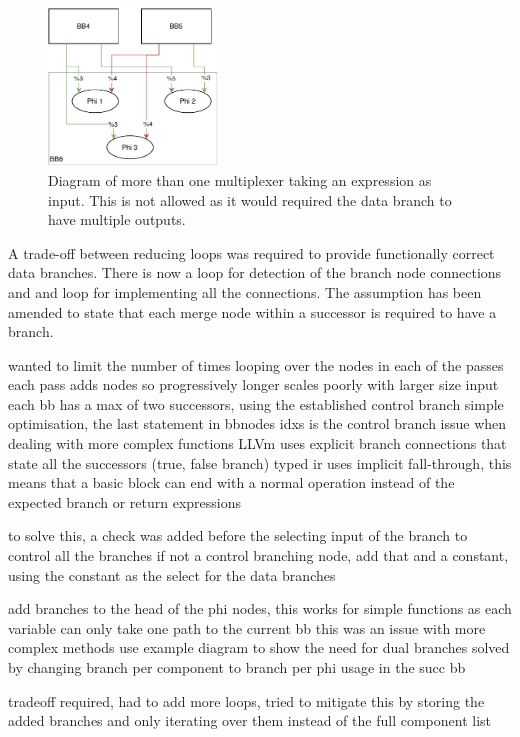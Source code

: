 \begin{figure}[htb!]
    \centering
    \includegraphics[width=0.4\textwidth]{Images/multi_mux.pdf}
    \caption{Diagram of more than one multiplexer taking an expression as input. This is not allowed as it would required the data branch to have multiple outputs.}
    \label{fig:multi_mux}
\end{figure}

A trade-off between reducing loops was required to provide functionally correct data branches. There is now a loop for detection of the branch node connections and and loop for implementing all the connections. The assumption has been amended to state that each merge node within a successor is required to have a branch.

\iffalse
	wanted to limit the number of times looping over the nodes in each of the passes
		each pass adds nodes so progressively longer
		scales poorly with larger size input	
	each bb has a max of two successors, using the established control branch 
	simple optimisation, the last statement in bbnodes idxs is the control branch
		issue when dealing with more complex functions
		LLVm uses explicit branch connections that state all the successors (true, false branch)
		typed ir uses implicit fall-through, this means that a basic block can end with a normal operation instead of the expected branch or return expressions
		
	to solve this, a check was added before the selecting input of the branch to control all the branches
		if not a control branching node, add that and a constant, using the constant as the select for the data branches

add branches to the head of the phi nodes, this works for simple functions as each variable can only take one path to the current bb
	this was an issue with more complex methods
	use example diagram to show the need for dual branches
	solved by changing branch per component to branch per phi usage in the succ bb
	
	tradeoff required, had to add more loops, tried to mitigate this by storing the added branches and only iterating over them instead of the full component list
		
